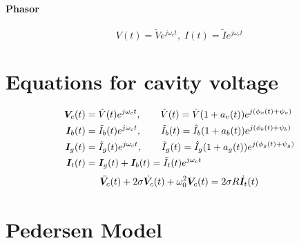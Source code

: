\documentclass[book]{jlreq}
\begin{document}
\paragraph{Phasor}
\begin{equation}
    V(t) = \tilde{V}e^{j\omega_c t}, \; I(t) = \tilde{I}e^{j\omega_c t}
\end{equation}

\clearpage

\section{Equations for cavity voltage}
\begin{equation}
    \begin{split}
        \vb*{V}_c(t) &= \tilde{V}(t)e^{j\omega_c t},\qquad \tilde{V}(t) = \hat{V}(1+a_v(t))e^{j(\phi_v(t)+\psi_v)} \\
        \vb*{I}_b(t) &= \tilde{I}_b(t) e^{j\omega_c t},\qquad \tilde{I}_b(t) = \hat{I}_b(1+a_b(t))e^{j(\phi_b(t)+\psi_b)} \\
        \vb*{I}_g(t) &= \tilde{I}_g(t) e^{j\omega_c t},\qquad \tilde{I}_g(t) = \hat{I}_g(1+a_g(t))e^{j(\phi_g(t)+\psi_g)} \\
        \vb*{I}_t(t) &= \vb*{I}_g(t) + \vb*{I}_b(t) = \tilde{I}_t(t) e^{j\omega_c t}
    \end{split}
\end{equation}
%
%
\begin{equation}
    \ddot{\vb*{V}_c}(t) + 2 \sigma \dot{\vb*{V}_c}(t) + \omega_0^2 \vb*{V}_c(t) = 2\sigma R \dot{\vb*{I}}_t(t)
\end{equation}
%
\clearpage

\section{Pedersen Model \cite{Pedersen} \cite{Ninomiya}}
\end{document}
